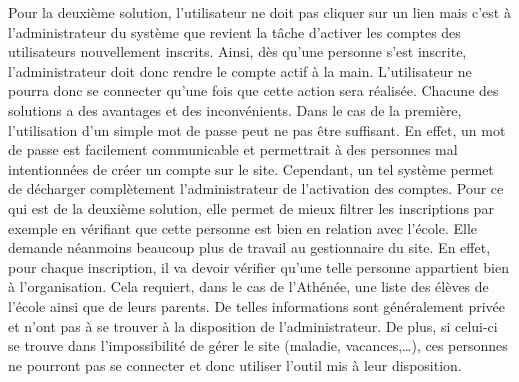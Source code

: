 \documentclass[12pt, a4paper, oneside]{article}
\begin{document}
    Pour la deuxième solution, l'utilisateur ne doit pas cliquer sur un lien mais c'est à l'administrateur du système que revient la tâche d'activer les comptes des utilisateurs nouvellement inscrits. Ainsi, dès qu'une personne s'est inscrite, l'administrateur doit donc rendre le compte actif à la main. L'utilisateur ne pourra donc se connecter qu'une fois que cette action sera réalisée. Chacune des solutions a des avantages et des inconvénients. Dans le cas de la première, l'utilisation d'un simple mot de passe peut ne pas être suffisant. En effet, un mot de passe est facilement communicable et permettrait à des personnes mal intentionnées de créer un compte sur le site. Cependant, un tel système permet de décharger complètement l'administrateur de l'activation des comptes. Pour ce qui est de la deuxième solution, elle permet de mieux filtrer les inscriptions par exemple en vérifiant que cette personne est bien en relation avec l'école. Elle demande néanmoins beaucoup plus de travail au gestionnaire du site. En effet, pour chaque inscription, il va devoir vérifier qu'une telle personne appartient bien à l'organisation. Cela requiert, dans le cas de l'Athénée, une liste des élèves de l'école ainsi que de leurs parents. De telles informations sont généralement privée et n'ont pas à se trouver à la disposition de l'administrateur. De plus, si celui-ci se trouve dans l'impossibilité de gérer le site (maladie, vacances,\dots), ces personnes ne pourront pas se connecter et donc utiliser l'outil mis à leur disposition. \\\\
\end{document}
